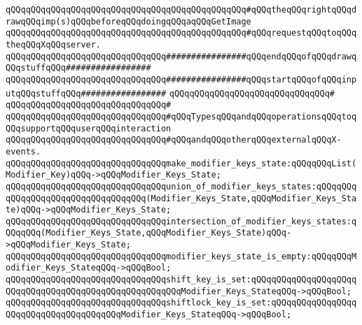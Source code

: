 \verb|qQQqqQQqqQQqqQQqqQQqqQQqqQQqqQQqqQQqqQQqqQQqqQQq#qQQqtheqQQqrightqQQqdrawqQQqimp(s)qQQqbeforeqQQqdoingqQQqaqQQqGetImage|\newline
\verb|qQQqqQQqqQQqqQQqqQQqqQQqqQQqqQQqqQQqqQQqqQQqqQQq#qQQqrequestqQQqtoqQQqtheqQQqXqQQqserver.|\newline
\newline
\newline
\verb|qQQqqQQqqQQqqQQqqQQqqQQqqQQqqQQq################qQQqendqQQqofqQQqdrawqQQqstuffqQQq#################|\newline
\newline
\newline
\newline
\verb|qQQqqQQqqQQqqQQqqQQqqQQqqQQqqQQq################qQQqstartqQQqofqQQqinputqQQqstuffqQQq#################|\newline
\verb|qQQqqQQqqQQqqQQqqQQqqQQqqQQqqQQq#|\newline
\verb|qQQqqQQqqQQqqQQqqQQqqQQqqQQqqQQq#|\newline
\newline
\verb|qQQqqQQqqQQqqQQqqQQqqQQqqQQqqQQq#qQQqTypesqQQqandqQQqoperationsqQQqtoqQQqsupportqQQquserqQQqinteraction|\newline
\verb|qQQqqQQqqQQqqQQqqQQqqQQqqQQqqQQq#qQQqandqQQqotherqQQqexternalqQQqX-events.|\newline
\newline
\verb|qQQqqQQqqQQqqQQqqQQqqQQqqQQqqQQqmake_modifier_keys_state:qQQqqQQqList(Modifier_Key)qQQq->qQQqModifier_Keys_State;|\newline
\newline
\verb|qQQqqQQqqQQqqQQqqQQqqQQqqQQqqQQqunion_of_modifier_keys_states:qQQqqQQqqQQqqQQqqQQqqQQqqQQqqQQqqQQq(Modifier_Keys_State,qQQqModifier_Keys_State)qQQq->qQQqModifier_Keys_State;|\newline
\verb|qQQqqQQqqQQqqQQqqQQqqQQqqQQqqQQqintersection_of_modifier_keys_states:qQQqqQQq(Modifier_Keys_State,qQQqModifier_Keys_State)qQQq->qQQqModifier_Keys_State;|\newline
\newline
\verb|qQQqqQQqqQQqqQQqqQQqqQQqqQQqqQQqmodifier_keys_state_is_empty:qQQqqQQqModifier_Keys_StateqQQq->qQQqBool;|\newline
\verb|qQQqqQQqqQQqqQQqqQQqqQQqqQQqqQQqshift_key_is_set:qQQqqQQqqQQqqQQqqQQqqQQqqQQqqQQqqQQqqQQqqQQqqQQqqQQqqQQqModifier_Keys_StateqQQq->qQQqBool;|\newline
\verb|qQQqqQQqqQQqqQQqqQQqqQQqqQQqqQQqshiftlock_key_is_set:qQQqqQQqqQQqqQQqqQQqqQQqqQQqqQQqqQQqqQQqModifier_Keys_StateqQQq->qQQqBool;|\newline
